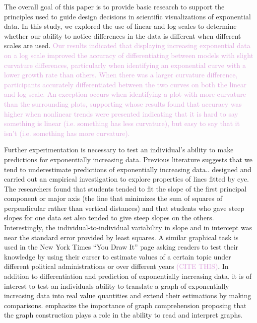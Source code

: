 \documentclass[]{interact}
\theoremstyle{plain}%
\theoremstyle{definition}
\theoremstyle{remark}
\begin{document}
The overall goal of this paper is to provide basic research to support
the principles used to guide design decisions in scientific
visualizations of exponential data. In this study, we explored the use
of linear and log scales to determine whether our ability to notice
differences in the data is different when different scales are used.
\textcolor{Plum}{Our results indicated that displaying increasing exponential data on a log scale improved the accuracy of differentiating between models with slight curvature differences, particularly when identifying an exponential curve with a lower growth rate than others. 
When there was a larger curvature difference, participants accurately differentiated between the two curves on both the linear and log scale. An exception occurs when identifying a plot with more curvature than the surrounding plots, supporting \cite{best_perception_2007} whose results found that accuracy was higher when nonlinear trends were presented indicating that it is hard to say something is linear (i.e. something has less curvature), but easy to say that it isn't (i.e. something has more curvature).}

Further experimentation is necessary to test an individual's ability to
make predictions for exponentially increasing data. Previous literature
suggests that we tend to underestimate predictions of exponentially
increasing
data.\citep{jones_generalized_1979, jones_polynomial_1977, wagenaar_extrapolation_1978}.
\citep{mosteller_eye_1981} designed and carried out an empirical
investigation to explore properties of lines fitted by eye. The
researchers found that students tended to fit the slope of the first
principal component or major axis (the line that minimizes the sum of
squares of perpendicular rather than vertical distances) and that
students who gave steep slopes for one data set also tended to give
steep slopes on the others. Interestingly, the individual-to-individual
variability in slope and in intercept was near the standard error
provided by least squares. A similar graphical task is used in the New
York Times ``You Draw It'' page asking readers to test their knowledge
by using their curser to estimate values of a certain topic under
different political administrations or over different years
\textcolor{Plum}{(CITE THIS)}. In addition to differentiation and
prediction of exponentially increasing data, it is of interest to test
an individuals ability to translate a graph of exponentially increasing
data into real value quantities and extend their estimations by making
comparisons. \citep{friel_making_2001} emphasize the importance of graph
comprehension proposing that the graph construction plays a role in the
ability to read and interpret graphs.
\end{document}
